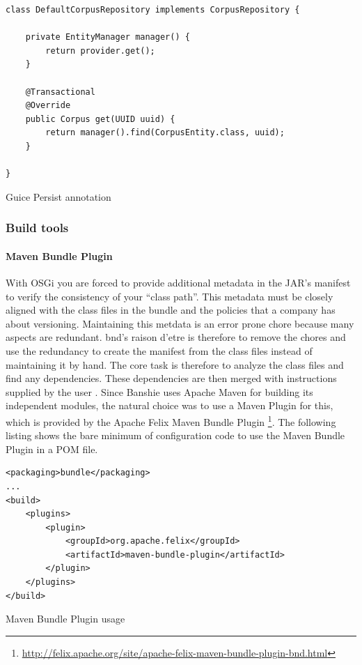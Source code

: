 \begin{listing}[H]
\begin{verbatim}
class DefaultCorpusRepository implements CorpusRepository {

    private EntityManager manager() {
        return provider.get();
    }

    @Transactional
    @Override
    public Corpus get(UUID uuid) {
        return manager().find(CorpusEntity.class, uuid);
    }

}
\end{verbatim}
\caption{Guice Persist annotation}
\end{listing}

\subsubsection{Build tools}
\paragraph{Maven Bundle Plugin}
With \gls{OSGi} you are forced to provide additional metadata in the JAR's manifest to verify the consistency of your \enquote{class path}. This metadata must be closely aligned with the class files in the bundle and the policies that a company has about versioning. Maintaining this metdata is an error prone chore because many aspects are redundant. bnd's raison d'etre is therefore to remove the chores and use the redundancy to create the manifest from the class files instead of maintaining it by hand. The core task is therefore to analyze the class files and find any dependencies. These dependencies are then merged with instructions supplied by the user \cite{BND}. Since Banshie uses Apache Maven for building its independent modules, the natural choice was to use a Maven Plugin for this, which is provided by the Apache Felix Maven Bundle Plugin \footnote{\url{http://felix.apache.org/site/apache-felix-maven-bundle-plugin-bnd.html}}. The following listing shows the bare minimum of configuration code to use the Maven Bundle Plugin in a POM file.

\begin{listing}[H]
\begin{verbatim}
<packaging>bundle</packaging>
...
<build>
    <plugins>
        <plugin>
            <groupId>org.apache.felix</groupId>
            <artifactId>maven-bundle-plugin</artifactId>
        </plugin>
    </plugins>
</build>
\end{verbatim}
\caption{Maven Bundle Plugin usage}
\end{listing}

